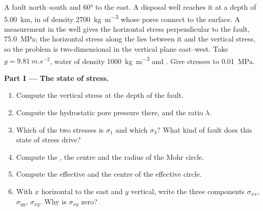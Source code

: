 \begin{problem}
\label{pb:b1:stress-strain-rheology:1}
A fault  north--south and  \ang{60} to the east. A disposal well
reaches it at a depth of \qty{5.00}{km}, in  of density
\qty{2700}{kg.m^{-3}} whose pores connect to the surface. A measurement in the
well gives the horizontal stress perpendicular to the fault,
\qty{75.0}{MPa}; the horizontal stress along the  lies between it and
the vertical stress, so the problem is two-dimensional in the vertical plane
east--west. Take $g = \qty{9.81}{m.s^{-2}}$, water of density
\qty{1000}{kg.m^{-3}} and . Give stresses to
\qty{0.01}{MPa}.

\medskip
\noindent\textbf{Part I --- The state of stress.}
\begin{enumerate}
  \item Compute the vertical stress at the depth of the fault.
  \item Compute the hydrostatic pore pressure there, and the ratio $\lambda$.
  \item Which of the two stresses is $\sigma_1$ and which $\sigma_3$? What kind
        of fault does this state of stress drive?
  \item Compute the , the centre and the radius of the
        Mohr circle.
  \item Compute the effective  and the centre of the
        effective circle.
  \item With $x$ horizontal to the east and $y$ vertical, write the three
        components $\sigma_{xx}$, $\sigma_{yy}$, $\sigma_{xy}$. Why is
        $\sigma_{xy}$ zero?
\end{enumerate}


\end{problem}
